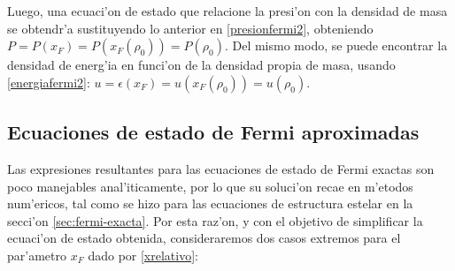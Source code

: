 Luego, una ecuaci'on de estado que relacione la presi'on con la densidad de masa se obtendr'a sustituyendo lo anterior en \eqref{presionfermi2}, obteniendo $P=P(x_F)=P(x_F(\rho_0))=P(\rho_0)$. Del mismo modo, se puede encontrar la densidad de energ'ia en funci'on de la densidad propia de masa, usando \eqref{energiafermi2}: $u=\epsilon(x_F)=u(x_F(\rho_0))=u(\rho_0)$.

\subsection{Ecuaciones de estado de Fermi aproximadas}
Las expresiones resultantes para las ecuaciones de estado de Fermi exactas son poco manejables anal'iticamente, por lo que su soluci'on recae en m'etodos num'ericos, tal como se hizo para las ecuaciones de estructura estelar en la secci'on \ref{sec:fermi-exacta}. Por esta raz'on, y con el objetivo de simplificar la ecuaci'on de estado obtenida, consideraremos dos casos extremos para el par'ametro $x_F$ dado por \eqref{xrelativo}:

